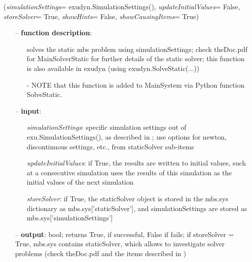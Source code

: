 \ei

%
\begin{flushleft}
\label{sec:mainsystemextensions:SolveStatic}
({\it simulationSettings}= exudyn.SimulationSettings(), {\it updateInitialValues}= False, {\it storeSolver}= True, {\it showHints}= False, {\it showCausingItems}= True)
\end{flushleft}
\setlength{\itemindent}{0.7cm}
\begin{itemize}[leftmargin=0.7cm]
\item[--]
{\bf function description}: \vspace{-6pt}
\begin{itemize}[leftmargin=1.2cm]
\setlength{\itemindent}{-0.7cm}
\item[]solves the static mbs problem using simulationSettings; check theDoc.pdf for MainSolverStatic for further details of the static solver; this function is also available in exudyn (using exudyn.SolveStatic(...))
\item[]- NOTE that this function is added to MainSystem via Python function SolveStatic.
\end{itemize}
\item[--]
{\bf input}: \vspace{-6pt}
\begin{itemize}[leftmargin=1.2cm]
\setlength{\itemindent}{-0.7cm}
\item[]{\it simulationSettings}: specific simulation settings out of exu.SimulationSettings(), as described in ; use options for newton, discontinuous settings, etc., from staticSolver sub-items
\item[]{\it updateInitialValues}: if True, the results are written to initial values, such at a consecutive simulation uses the results of this simulation as the initial values of the next simulation
\item[]{\it storeSolver}: if True, the staticSolver object is stored in the mbs.sys dictionary as mbs.sys['staticSolver'], and simulationSettings are stored as mbs.sys['simulationSettings']
\end{itemize}
\item[--]
{\bf output}: bool; returns True, if successful, False if fails; if storeSolver = True, mbs.sys contains staticSolver, which allows to investigate solver problems (check theDoc.pdf  and the items described in )

\end{itemize}

